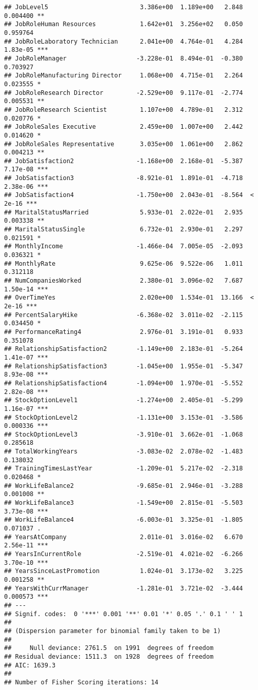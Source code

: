 \documentclass[
]{article}
\begin{document}
\begin{verbatim}
## JobLevel5                         3.386e+00  1.189e+00   2.848 0.004400 ** 
## JobRoleHuman Resources            1.642e+01  3.256e+02   0.050 0.959764    
## JobRoleLaboratory Technician      2.041e+00  4.764e-01   4.284 1.83e-05 ***
## JobRoleManager                   -3.228e-01  8.494e-01  -0.380 0.703927    
## JobRoleManufacturing Director     1.068e+00  4.715e-01   2.264 0.023555 *  
## JobRoleResearch Director         -2.529e+00  9.117e-01  -2.774 0.005531 ** 
## JobRoleResearch Scientist         1.107e+00  4.789e-01   2.312 0.020776 *  
## JobRoleSales Executive            2.459e+00  1.007e+00   2.442 0.014620 *  
## JobRoleSales Representative       3.035e+00  1.061e+00   2.862 0.004213 ** 
## JobSatisfaction2                 -1.168e+00  2.168e-01  -5.387 7.17e-08 ***
## JobSatisfaction3                 -8.921e-01  1.891e-01  -4.718 2.38e-06 ***
## JobSatisfaction4                 -1.750e+00  2.043e-01  -8.564  < 2e-16 ***
## MaritalStatusMarried              5.933e-01  2.022e-01   2.935 0.003338 ** 
## MaritalStatusSingle               6.732e-01  2.930e-01   2.297 0.021591 *  
## MonthlyIncome                    -1.466e-04  7.005e-05  -2.093 0.036321 *  
## MonthlyRate                       9.625e-06  9.522e-06   1.011 0.312118    
## NumCompaniesWorked                2.380e-01  3.096e-02   7.687 1.50e-14 ***
## OverTimeYes                       2.020e+00  1.534e-01  13.166  < 2e-16 ***
## PercentSalaryHike                -6.368e-02  3.011e-02  -2.115 0.034450 *  
## PerformanceRating4                2.976e-01  3.191e-01   0.933 0.351078    
## RelationshipSatisfaction2        -1.149e+00  2.183e-01  -5.264 1.41e-07 ***
## RelationshipSatisfaction3        -1.045e+00  1.955e-01  -5.347 8.93e-08 ***
## RelationshipSatisfaction4        -1.094e+00  1.970e-01  -5.552 2.82e-08 ***
## StockOptionLevel1                -1.274e+00  2.405e-01  -5.299 1.16e-07 ***
## StockOptionLevel2                -1.131e+00  3.153e-01  -3.586 0.000336 ***
## StockOptionLevel3                -3.910e-01  3.662e-01  -1.068 0.285618    
## TotalWorkingYears                -3.083e-02  2.078e-02  -1.483 0.138032    
## TrainingTimesLastYear            -1.209e-01  5.217e-02  -2.318 0.020468 *  
## WorkLifeBalance2                 -9.685e-01  2.946e-01  -3.288 0.001008 ** 
## WorkLifeBalance3                 -1.549e+00  2.815e-01  -5.503 3.73e-08 ***
## WorkLifeBalance4                 -6.003e-01  3.325e-01  -1.805 0.071037 .  
## YearsAtCompany                    2.011e-01  3.016e-02   6.670 2.56e-11 ***
## YearsInCurrentRole               -2.519e-01  4.021e-02  -6.266 3.70e-10 ***
## YearsSinceLastPromotion           1.024e-01  3.173e-02   3.225 0.001258 ** 
## YearsWithCurrManager             -1.281e-01  3.721e-02  -3.444 0.000573 ***
## ---
## Signif. codes:  0 '***' 0.001 '**' 0.01 '*' 0.05 '.' 0.1 ' ' 1
## 
## (Dispersion parameter for binomial family taken to be 1)
## 
##     Null deviance: 2761.5  on 1991  degrees of freedom
## Residual deviance: 1511.3  on 1928  degrees of freedom
## AIC: 1639.3
## 
## Number of Fisher Scoring iterations: 14
\end{verbatim}
\end{document}
